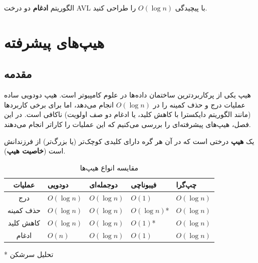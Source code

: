 \documentclass{matinbook}
\begin{document}
    \begin{exercise}
        الگوریتم \textbf{ادغام} دو درخت AVL
        با پیچیدگی $O(\log n)$ را طراحی کنید.
        \label{exc:avl-merge}
    \end{exercise}
    
    
    \chapter{هیپ‌های پیشرفته}
    \label{chap:advanced-heaps}
    
    \section{مقدمه}
    
    هیپ یکی از پرکاربردترین ساختمان داده‌ها
    در علوم کامپیوتر است. هیپ دودویی ساده
    عملیات درج و حذف کمینه را در $O(\log n)$
    انجام می‌دهد، اما برای برخی کاربردها
    (مانند الگوریتم دایکسترا با کاهش کلید،
    یا ادغام دو صف اولویت) ناکافی است.
    در این فصل، هیپ‌های پیشرفته‌ای را بررسی می‌کنیم
    که این عملیات را کاراتر انجام می‌دهند.
    
    \begin{definition}[هیپ]
        یک \textbf{هیپ} درختی است که در آن
        هر گره دارای کلیدی کوچک‌تر (یا بزرگ‌تر)
        از فرزندانش است (\textbf{خاصیت هیپ}).
        \label{def:heap}
    \end{definition}
    
    \begin{table}[h]
        \centering
        \caption{مقایسه انواع هیپ‌ها}
        \label{tab:heap-comparison}
        \begin{tabular}{|c|C{2.5cm}|C{2.5cm}|C{2.5cm}|C{2.5cm}|}
            \hline
            \textbf{عملیات} & \textbf{دودویی} & \textbf{دوجمله‌ای} & \textbf{فیبوناچی} & \textbf{چپ‌گرا} \\
            \hline
            درج & $O(\log n)$ & $O(\log n)$ & $O(1)$ & $O(\log n)$ \\
            حذف کمینه & $O(\log n)$ & $O(\log n)$ & $O(\log n)$* & $O(\log n)$ \\
            کاهش کلید & $O(\log n)$ & $O(\log n)$ & $O(1)$* & $O(\log n)$ \\
            ادغام & $O(n)$ & $O(\log n)$ & $O(1)$ & $O(\log n)$ \\
            \hline
        \end{tabular}
    \end{table}
    * تحلیل سرشکن
    
\end{document}
